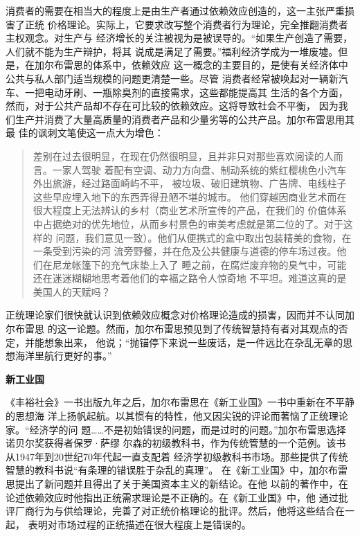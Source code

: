 消费者的需要在相当大的程度上是由生产者通过依赖效应创造的，这一主张严重损害了正统
价格理论。实际上，它要求改写整个消费者行为理论，完全推翻消费者主权观念。对生产与
经济增长的关注被视为是被误导的。“如果生产创造了需要，人们就不能为生产辩护，将其
说成是满足了需要。”福利经济学成为一堆废墟。但是，在加尔布雷思的体系中，依赖效应
这一概念的主要目的，是使有关经济体中公共与私人部门适当规模的问题更清楚一些。尽管
消费者经常被唤起对一辆新汽车、一把电动牙刷、一瓶除臭剂的直接需求，这些都能提高其
生活的各个方面，然而，对于公共产品却不存在可比较的依赖效应。这将导致社会不平衡，
因为我们生产并消费了大量高质量的消费者产品和少量劣等的公共产品。加尔布雷思用其最
佳的讽刺文笔使这一点大为增色：

\begin{quotation}
  差别在过去很明显，在现在仍然很明显，且并非只对那些喜欢阅读的人而言。一家人驾驶
  着配有空调、动力方向盘、制动系统的紫红樱桃色小汽车外出旅游，经过路面崎屿不平，
  被垃圾、破旧建筑物、广告牌、电线柱子这些早应埋入地下的东西弄得丑陋不堪的城市。
  他们穿越因商业艺术而在很大程度上无法辨认的乡村（商业艺术所宣传的产品，在我们的
  价值体系中占据绝对的优先地位，从而乡村景色的审美考虑就是第二位的了。对于这样的
  问题，我们意见一致）。他们从便携式的盒中取出包装精美的食物，在一条受到污染的河
  流旁野餐，并在危及公共健康与道德的停车场过夜。他们在尼龙帐篷下的充气床垫上入了
  睡之前，在腐烂废弃物的臭气中，可能还在迷迷糊糊地思考着他们的幸福之路令人惊奇地
  不平坦。难道这真的是美国人的天赋吗？
\end{quotation}

正统理论家们很快就认识到依赖效应概念对价格理论造成的损害，因而并不认同加尔布雷思
的这一论题。然而，加尔布雷思预见到了传统智慧持有者对其观点的否定，并能想象出来，
他说；“抛锚停下来说一些废话，是一件远比在杂乱无章的思想海洋里航行更好的事。”

\textbf{\sffamily 新工业国}

《丰裕社会》一书出版九年之后，加尔布雷思在《新工业国》一书中重新在不平静的思想海
洋上扬帆起航。以其惯有的特性，他又因尖锐的评论而著恼了正统理论家。“经济学的问
题……不是初始错误的问题，而是过时的问题。”加尔布雷思选择诺贝尔奖获得者保罗·萨缪
尔森的初级教科书，作为传统管慧的一个范例。该书从1947年到20世纪70年代起一直支配着
经济学初级教科书市场。那些提供了传统智慧的教科书说“有条理的错误胜于杂乱的真理”。
在《新工业国》中，加尔布雷思提出了新问题并且得出了关于美国资本主义的新结论。在他
以前的著作中，在论述依赖效应时他指出正统需求理论是不正确的。在《新工业国》中，他
通过批评厂商行为与供给理论，完善了对正统价格理论的批评。然后，他将这些结合在一起，
表明对市场过程的正统描述在很大程度上是错误的。

